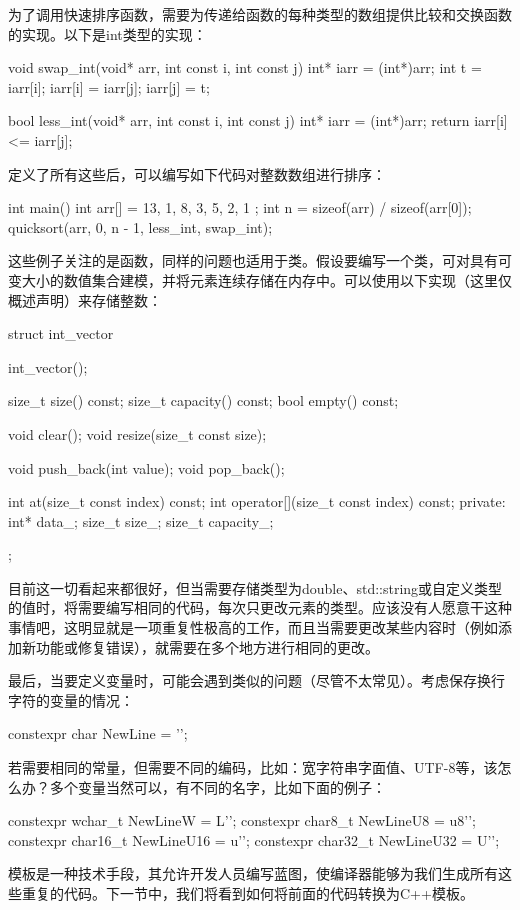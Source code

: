 为了调用快速排序函数，需要为传递给函数的每种类型的数组提供比较和交换函数的实现。以下是int类型的实现：

\begin{cppcode}
void swap_int(void* arr, int const i, int const j)
{
	int* iarr = (int*)arr;
	int t = iarr[i];
	iarr[i] = iarr[j];
	iarr[j] = t;
}

bool less_int(void* arr, int const i, int const j)
{
	int* iarr = (int*)arr;
	return iarr[i] <= iarr[j];
}
\end{cppcode}

定义了所有这些后，可以编写如下代码对整数数组进行排序：

\begin{cppcode}
int main()
{
	int arr[] = { 13, 1, 8, 3, 5, 2, 1 };
	int n = sizeof(arr) / sizeof(arr[0]);
	quicksort(arr, 0, n - 1, less_int, swap_int);
}
\end{cppcode}

这些例子关注的是函数，同样的问题也适用于类。假设要编写一个类，可对具有可变大小的数值集合建模，并将元素连续存储在内存中。可以使用以下实现（这里仅概述声明）来存储整数：

\begin{cppcode}
struct int_vector
{
	int_vector();
	
	size_t size() const;
	size_t capacity() const;
	bool empty() const;
	
	void clear();
	void resize(size_t const size);
	
	void push_back(int value);
	void pop_back();
	
	int at(size_t const index) const;
	int operator[](size_t const index) const;
private:
	int* data_;
	size_t size_;
	size_t capacity_;
};
\end{cppcode}

目前这一切看起来都很好，但当需要存储类型为double、std::string或自定义类型的值时，将需要编写相同的代码，每次只更改元素的类型。应该没有人愿意干这种事情吧，这明显就是一项重复性极高的工作，而且当需要更改某些内容时（例如添加新功能或修复错误），就需要在多个地方进行相同的更改。

最后，当要定义变量时，可能会遇到类似的问题（尽管不太常见）。考虑保存换行字符的变量的情况：

\begin{cppcode}
constexpr char NewLine = '\n';
\end{cppcode}

若需要相同的常量，但需要不同的编码，比如：宽字符串字面值、UTF-8等，该怎么办？多个变量当然可以，有不同的名字，比如下面的例子：

\begin{cppcode}
constexpr wchar_t NewLineW = L'\n';
constexpr char8_t NewLineU8 = u8'\n';
constexpr char16_t NewLineU16 = u'\n';
constexpr char32_t NewLineU32 = U'\n';
\end{cppcode}

模板是一种技术手段，其允许开发人员编写蓝图，使编译器能够为我们生成所有这些重复的代码。下一节中，我们将看到如何将前面的代码转换为C++模板。






